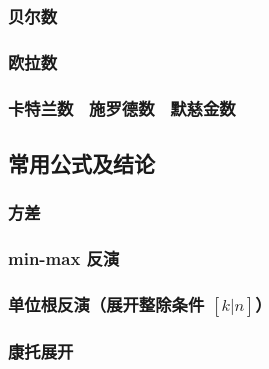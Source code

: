 \documentclass[a4paper, twoside]{article}
\begin{document}
\begin{multicols}{2}
				\subsubsection[贝尔数~Bell]{贝尔数}
					\label{BellNumber}
					
				
				\subsubsection[欧拉数~Eulerian]{欧拉数}
					\label{EulerianNumber}
					
				
				\subsubsection{卡特兰数 \  施罗德数 \  默慈金数}
					\label{catalan}
					
			
			\subsection{常用公式及结论}
				\subsubsection{方差}
					
				
				\subsubsection{min-max 反演}
					
				
				\subsubsection{单位根反演（展开整除条件 $\left[k|n\right]$）}
					
				
				\subsubsection[康托展开（排列的排名）]{康托展开}
					
				


\end{multicols}
\end{document}
